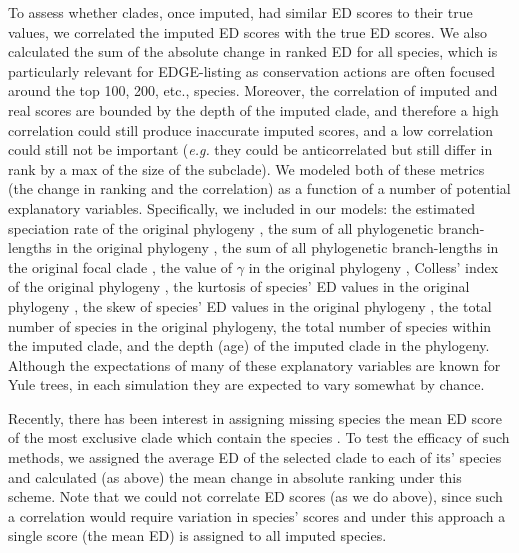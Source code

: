 \documentclass[10pt,english]{article}
\begin{document}
To assess whether clades, once imputed, had similar ED scores to their true
values, we correlated the imputed ED scores with the true ED scores. We also
calculated the sum of the absolute change in ranked ED for all species, which is
particularly relevant for EDGE-listing as conservation actions are often focused
around the top 100, 200, etc., species. Moreover, the correlation of imputed and
real scores are bounded by the depth of the imputed clade, and therefore a high
correlation could still produce inaccurate imputed scores, and a low correlation
could still not be important (\emph{e.g.} they could be anticorrelated but still
differ in rank by a max of the size of the subclade). We modeled both of these
metrics (the change in ranking and the correlation) as a function of a number of
potential explanatory variables. Specifically, we included in our models: the
estimated speciation rate of the original phylogeny \autocite[using
`ape::yule';][]{Paradis2004}, the sum of all phylogenetic branch-lengths
in the original phylogeny \autocite[Faith's PD;][]{Faith1992}, the sum of all
phylogenetic branch-lengths in the original focal clade \autocite[Faith's
PD;][]{Faith1992}, the value of $\gamma$ in the original phylogeny
\autocite[using `phytools::gammatest';][]{Pybus2000, Revell2012},
Colless' index of the original phylogeny \autocite[using
`apTreeshape::as.treeshape';][]{Colless1982, Bortolussi2009}, the
kurtosis of species' ED values in the original phylogeny \autocite[using
`moments::kurtosis';][]{Komsta2015}, the skew of species' ED values in
the original phylogeny \autocite[using `moments::skew';][]{Komsta2015},
the total number of species in the original phylogeny, the total number of
species within the imputed clade, and the depth (age) of the imputed clade in
the phylogeny. Although the expectations of many of these explanatory variables
are known for Yule trees, in each simulation they are expected to vary somewhat
by chance.

Recently, there has been interest in assigning missing species the mean ED score
of the most exclusive clade which contain the species
\autocite[see][]{Gumbs2018}. To test the efficacy of such methods, we assigned
the average ED of the selected clade to each of its' species and calculated (as
above) the mean change in absolute ranking under this scheme. Note that we could
not correlate ED scores (as we do above), since such a correlation would require
variation in species' scores and under this approach a single score (the mean
ED) is assigned to all imputed species.
\end{document}
